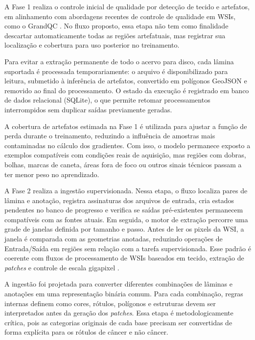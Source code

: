 A Fase 1 realiza o controle inicial de qualidade por detecção de tecido e
artefatos, em alinhamento com abordagens recentes de controle de qualidade em
WSIs, como o GrandQC \cite{weng2024grandqc}. No fluxo proposto, essa etapa não
tem como finalidade descartar automaticamente todas as regiões artefatuais, mas
registrar sua localização e cobertura para uso posterior no treinamento.

Para evitar a extração permanente de todo o acervo para disco, cada lâmina
suportada é processada temporariamente: o arquivo é disponibilizado para leitura,
submetido à inferência de artefatos, convertido em polígonos GeoJSON e removido
ao final do processamento. O estado da execução é registrado em banco de dados relacional (SQLite), o que
permite retomar processamentos interrompidos sem duplicar saídas previamente
geradas.

A cobertura de artefatos estimada na Fase 1 é utilizada para ajustar a função de
perda durante o treinamento, reduzindo a influência de amostras mais contaminadas
no cálculo dos gradientes. Com isso, o modelo permanece exposto a exemplos
compatíveis com condições reais de aquisição, mas regiões com dobras, bolhas,
marcas de caneta, áreas fora de foco ou outros sinais técnicos passam a ter menor
peso no aprendizado.

A Fase 2 realiza a ingestão supervisionada. Nessa etapa, o fluxo localiza pares
de lâmina e anotação, registra assinaturas dos arquivos de entrada, cria estados
pendentes no banco de progresso e verifica se saídas pré-existentes permanecem
compatíveis com as fontes atuais. Em seguida, o motor de extração percorre uma
grade de janelas definida por tamanho e passo. Antes de ler os pixels da WSI, a
janela é comparada com as geometrias anotadas, reduzindo operações de Entrada/Saída em
regiões sem relação com a tarefa supervisionada. Esse padrão é coerente com
fluxos de processamento de WSIs baseados em tecido, extração de \textit{patches}
e controle de escala gigapixel
\cite{munozaguirre2020pyhist,khened2021generalized,bandi2019resolution}.

A ingestão foi projetada para converter diferentes combinações de lâminas e
anotações em uma representação binária comum. Para cada combinação,
regras internas definem como cores, rótulos, polígonos e estruturas devem
ser interpretados antes da geração dos \textit{patches}. Essa etapa é
metodologicamente crítica, pois as categorias originais de cada base precisam
ser convertidas de forma explícita para os rótulos de câncer e não câncer.

